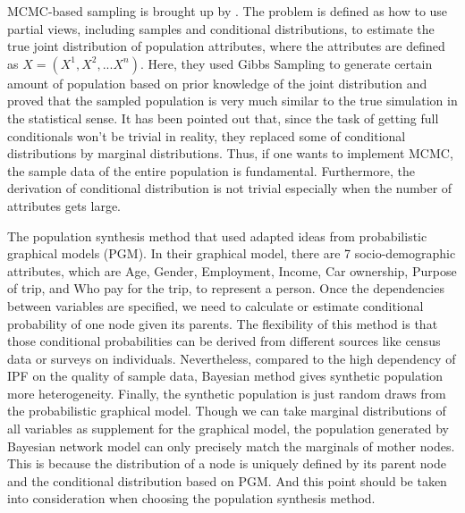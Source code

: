 \documentclass[11pt,twoside]{article}
\numberwithin{equation}{section}
\newcommand{\?}{\stackrel{?}{=}}
\begin{document}
MCMC-based sampling is brought up by \textcite{farooq2013simulation}.
The problem is defined as how to use partial views, including samples and conditional distributions, to estimate the true joint distribution of population attributes, where the attributes are defined as $X = (X^1, X^2, ... X^n)$.
Here, they used Gibbs Sampling to generate certain amount of population based on prior knowledge of the joint distribution and proved that the sampled population is very much similar to the true simulation in the statistical sense.
It has been pointed out that, since the task of getting full conditionals won't be trivial in reality, they replaced some of conditional distributions by marginal distributions.
Thus, if one wants to implement MCMC, the sample data of the entire population is fundamental.
Furthermore, the derivation of conditional distribution is not trivial especially when the number of attributes gets large.

The population synthesis method that \citet{petrik2016measuring} used adapted ideas from probabilistic graphical models (PGM).
In their graphical model, there are 7 socio-demographic attributes, which are Age, Gender, Employment, Income, Car ownership, Purpose of trip, and Who pay for the trip, to represent a person.
Once the dependencies between variables are specified, we need to calculate or estimate conditional probability of one node given its parents.
The flexibility of this method is that those conditional probabilities can be derived from different sources like census data or surveys on individuals. Nevertheless, compared to the high dependency of IPF on the quality of sample data, Bayesian method gives synthetic population more heterogeneity.
Finally, the synthetic population is just random draws from the probabilistic graphical model.
Though we can take marginal distributions of all variables as supplement for the graphical model, the population generated by Bayesian network model can only precisely match the marginals of mother nodes.
This is because the distribution of a node is uniquely defined by its parent node and the conditional distribution based on PGM.
And this point should be taken into consideration when choosing the population synthesis method. 
\end{document}
